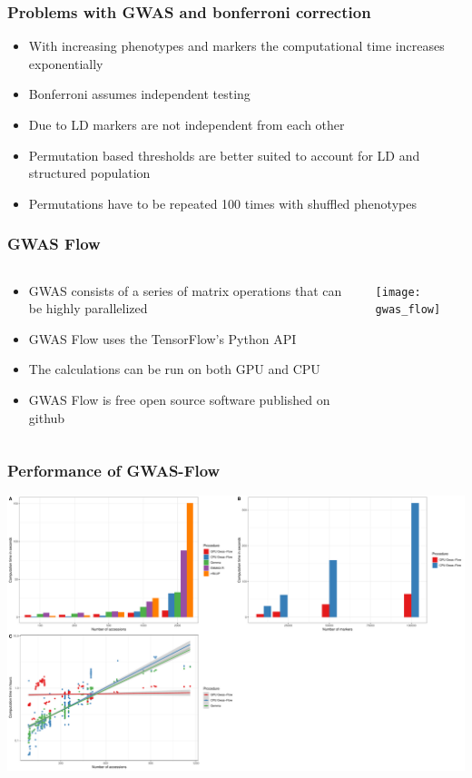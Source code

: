 \documentclass{beamer}
\begin{document}
\begin{frame}
  \frametitle{Problems with GWAS and bonferroni correction}
  \begin{itemize}[<+->]
  \item With increasing phenotypes and markers the computational time increases exponentially
  \item Bonferroni assumes independent testing
  \item Due to LD markers are not independent from each other
  \item Permutation based thresholds are better suited to account for LD and structured population
  \item Permutations have to be repeated 100 times with shuffled phenotypes
  \end{itemize}
\end{frame}

\begin{frame}
  \frametitle{GWAS Flow}
  \begin{columns}
    \begin{column}{0.5\textwidth}
      \begin{itemize}[<+->]
      \item GWAS consists of a series of matrix operations that can be highly parallelized
      \item GWAS Flow uses the TensorFlow's Python API 
      \item The calculations can be run on both GPU and CPU
      \item GWAS Flow is free open source software published on github
      \end{itemize}
    \end{column}
    \begin{column}{0.5\textwidth}
      \texttt{[image: gwas\_flow]}
        \end{column}
\end{columns}
\end{frame}

\begin{frame}
  \frametitle{Performance of GWAS-Flow }
  \includegraphics[height=.8\textheight,width=.9\textwidth]{final_plot2.pdf}
\end{frame}
\end{document}
